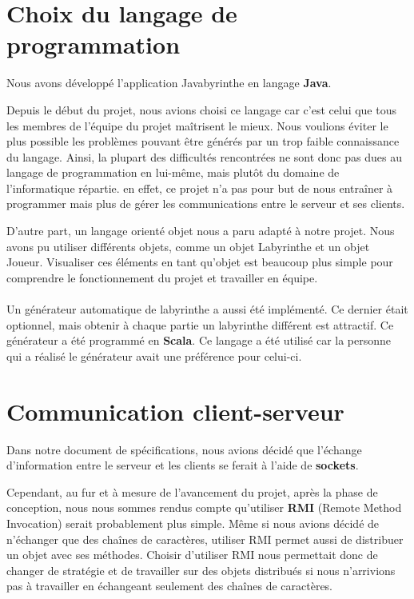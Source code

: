 \section{Choix du langage de programmation}
	Nous avons développé l'application Javabyrinthe en langage \textbf{Java}.

	Depuis le début du projet, nous avions choisi ce langage car c'est celui que tous les membres de l'équipe du projet maîtrisent le mieux. Nous voulions éviter le plus possible les problèmes pouvant être générés par un trop faible connaissance du langage. Ainsi, la plupart des difficultés rencontrées ne sont donc pas dues au langage de programmation en lui-même, mais plutôt du domaine de l'informatique répartie. en effet, ce projet n'a pas pour but de nous entraîner à programmer mais plus de gérer les communications entre le serveur et ses clients.

	D'autre part, un langage orienté objet nous a paru adapté à notre projet. Nous avons pu utiliser différents objets, comme un objet Labyrinthe et un objet Joueur. Visualiser ces éléments en tant qu'objet est beaucoup plus simple pour comprendre le fonctionnement du projet et travailler en équipe.

	\paragraph*{}
	Un générateur automatique de labyrinthe a aussi été implémenté. Ce dernier était optionnel, mais obtenir à chaque partie un labyrinthe différent est attractif. Ce générateur a été programmé en \textbf{Scala}. Ce langage a été utilisé car la personne qui a réalisé le générateur avait une préférence pour celui-ci.

\section{Communication client-serveur}
	Dans notre document de spécifications, nous avions décidé que l'échange d'information entre le serveur et les clients se ferait à l'aide de \textbf{sockets}.

	Cependant, au fur et à mesure de l'avancement du projet, après la phase de conception, nous nous sommes rendus compte qu'utiliser \textbf{RMI} (Remote Method Invocation) serait probablement plus simple. Même si nous avions décidé de n'échanger que des chaînes de caractères, utiliser RMI permet aussi de distribuer un objet avec ses méthodes. Choisir d'utiliser RMI nous permettait donc de changer de stratégie et de travailler sur des objets distribués si nous n'arrivions pas à travailler en échangeant seulement des chaînes de caractères.


